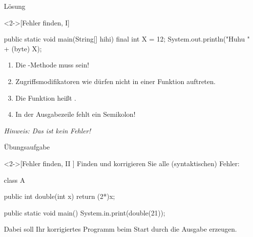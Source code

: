 \begin{frame}[c,fragile]{Lösung}
    \begin{solve}<2->[Fehler finden, I]
        \pause{}\begin{plainjava}
public static void main(String[] hihi) {
    final int X = 12;
    System.out.println("Huhu " + (byte) X);
}
        \end{plainjava}
    \begin{enumerate}[<+(1)->]
        \item Die -Methode muss  sein!
        \item Zugriffsmodifikatoren wie  dürfen nicht in einer Funktion auftreten.
        \item Die Funktion  heißt .
        \item In der Ausgabezeile fehlt ein Semikolon!
    \end{enumerate}
    \pause{}\textit{Hinweis: Das  ist kein Fehler!}
    \end{solve}
\end{frame}

\begin{frame}[c,fragile]{Übungsaufgabe}
    \begin{exercise}<2->[Fehler finden, II ]
        \pause{}Finden und korrigieren Sie alle (syntaktischen) Fehler:\pause{}
        \begin{plainvoid}
class A {
    public int double(int x) { return (2*)x; }

    public static void main() {
        System.in.print(double(21));
    }
}
        \end{plainvoid}
        Dabei soll Ihr korrigiertes Programm beim Start durch  die Ausgabe  erzeugen.
    \end{exercise}
\end{frame}

